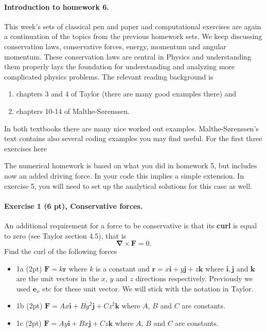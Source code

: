 \documentclass[%
oneside,                 %
final,                   %
10pt]{article}
\begin{document}
\noindent
\paragraph{Introduction to homework 6.}
This week's sets of classical pen and paper and computational
exercises are again a continuation of the topics from the previous homework sets. We keep
discussing conservation laws, conservative forces, energy, momentum and angular momentum. These conservation laws are central in Physics and understanding them properly lays the foundation for understanding and analyzing more complicated physics problems.
The relevant reading background is
\begin{enumerate}
\item chapters 3 and 4 of Taylor (there are many good examples there) and

\item chapters 10-14 of Malthe-Sørenssen.
\end{enumerate}

\noindent
In both textbooks there are many nice worked out examples. Malthe-Sørenssen's text contains also several coding examples you may find useful. For the first three exercises here 


The numerical homework is based on what you did in homework 5, but includes now an added driving force. In your code this implies a simple extension. In exercise 5, you will need to set up the analytical solutions for this case as well. 


\paragraph{Exercise 1 (6 pt), Conservative forces.}
An additional requirement for a force to be conservative is that its \textbf{curl} is equal to zero (see Taylor section 4.5), that is
\[
\bm{\nabla}\times \bm{F} =0.
\]
Find the curl of the following forces
\begin{itemize}
\item 1a (2pt) $\bm{F}=k\bm{r}$ where $k$ is a constant and $\bm{r}=x\bm{i}+y\bm{j}+z\bm{k}$ where $\bm{i},\bm{j}$ and $\bm{k}$ are the unit vectors in the $x$, $y$ and $z$ directions respectively. Previously we used $\bm{e}_x$ etc for these unit vector. We will stick with the notation in Taylor.

\item 1b (2pt) $\bm{F}=Ax\bm{i}+By^2\bm{j}+Cz^2\bm{k}$ where $A$, $B$ and $C$ are constants.

\item 1c (2pt) $\bm{F}=Ay\bm{i}+Bx\bm{j}+Cz\bm{k}$ where $A$, $B$ and $C$ are constants.
\end{itemize}
\end{document}
